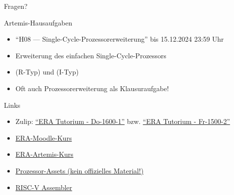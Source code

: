 \documentclass[
  german,            %
  aspectratio=169,    %
]{tumbeamer}
\begin{document}
\begin{frame}[c, fragile]{}{}
	\begin{center}
		\LARGE Fragen?
	\end{center}
\end{frame}

\begin{frame}[c, fragile]{Artemis-Hausaufgaben}{}
	\begin{itemize}
		\item \enquote{H08 --- Single-Cycle-Prozessorerweiterung} bis 15.12.2024 23:59 Uhr
		\item Erweiterung des einfachen Single-Cycle-Prozessors
		\item {} (R-Typ) und {} (I-Typ)
		\item Oft auch Prozessorerweiterung als Klausuraufgabe!
	\end{itemize}
\end{frame}

\begin{frame}[c, fragile]{Links}{}
	\begin{itemize}
		\item Zulip: \href{https://zulip.in.tum.de/#narrow/stream/2661-ERA-Tutorium---Do-1600-1}{\enquote{ERA Tutorium - Do-1600-1}}
		      bzw. \href{https://zulip.in.tum.de/#narrow/stream/2675-ERA-Tutorium---Fr-1500-2 }{\enquote{ERA Tutorium - Fr-1500-2}}
		\item \href{https://www.moodle.tum.de/course/view.php?id=100633}{ERA-Moodle-Kurs}
		\item \href{https://artemis.in.tum.de/courses/401}{ERA-Artemis-Kurs}
		\item \href{https://courses.edx.org/assets/courseware/v1/f06a2dc0c856f60ec0711e9f5e1c98cf/asset-v1:HarveyMuddX+ENGR85B+1T2023+type@asset+block/FinalReferences.pdf}{Prozessor-Assets (kein offizielles Material!)}
		\item \href{https://riscvasm.lucasteske.dev/}{RISC-V Assembler}
	\end{itemize}
\end{frame}

\maketitle
\end{document}
